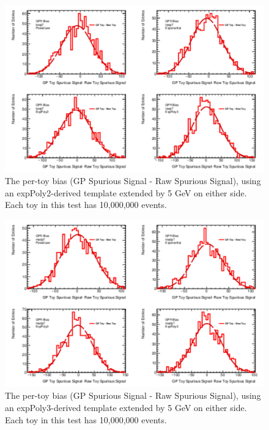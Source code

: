 \begin{figure} 
\begin{center}
  \includegraphics[width=\textwidth]{figures/background/gpr/validation/padded/ToyTest_FitSigBiases_lowpT_10M_noSig}   
\caption{The per-toy bias (GP Spurious Signal - Raw Spurious Signal), using an expPoly2-derived template extended by 5 GeV on either side. Each toy in this test has 10,000,000 events.}
\label{fig:bias_padded_lowpt_10M_noSig}
\end{center}
\end{figure}

\begin{figure} 
\begin{center}
  \includegraphics[width=\textwidth]{figures/background/gpr/validation/padded/ToyTest_FitSigBiases_medpT_10M_noSig}   
\caption{The per-toy bias (GP Spurious Signal - Raw Spurious Signal), using an expPoly3-derived template extended by 5 GeV on either side. Each toy in this test has 10,000,000 events.}
\label{fig:bias_padded_medpt_10M_noSig}
\end{center}
\end{figure}


